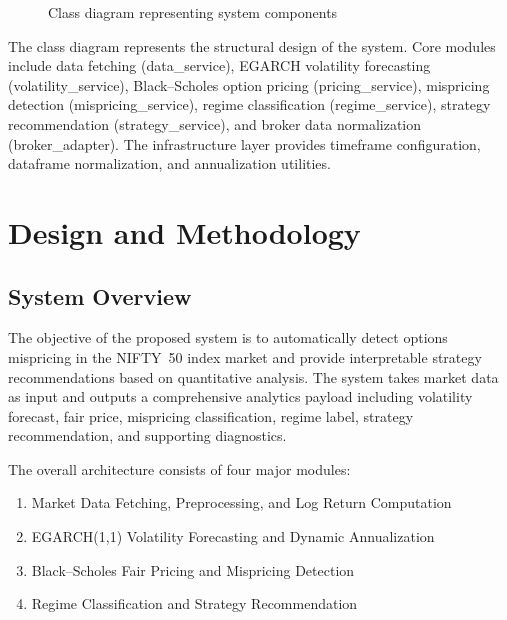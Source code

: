 \documentclass[12pt,a4paper]{article}
\begin{document}
\begin{figure}[H]
\caption{Class diagram representing system components}
\label{fig:classdiagram}
\end{figure}

The class diagram represents the structural design of the system. Core modules include data fetching (data\_service), EGARCH volatility forecasting (volatility\_service), Black--Scholes option pricing (pricing\_service), mispricing detection (mispricing\_service), regime classification (regime\_service), strategy recommendation (strategy\_service), and broker data normalization (broker\_adapter). The infrastructure layer provides timeframe configuration, dataframe normalization, and annualization utilities.

\newpage
\section{Design and Methodology}

\subsection{System Overview}

The objective of the proposed system is to automatically detect options mispricing in the NIFTY~50 index market and provide interpretable strategy recommendations based on quantitative analysis. The system takes market data as input and outputs a comprehensive analytics payload including volatility forecast, fair price, mispricing classification, regime label, strategy recommendation, and supporting diagnostics.

The overall architecture consists of four major modules:

\begin{enumerate}
    \item Market Data Fetching, Preprocessing, and Log Return Computation
    \item EGARCH(1,1) Volatility Forecasting and Dynamic Annualization
    \item Black--Scholes Fair Pricing and Mispricing Detection
    \item Regime Classification and Strategy Recommendation
\end{enumerate}
\end{document}
